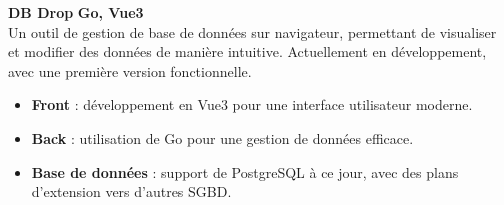 \documentclass[a4paper,10pt]{article}
\begin{document}
\begin{paracol}{2}
\begin{flushleft}
  \textbf{DB Drop} \hfill \textbf{Go, Vue3} \\
  Un outil de gestion de base de données sur navigateur, permettant de visualiser et modifier des données de manière intuitive.
  Actuellement en développement, avec une première version fonctionnelle.
  \begin{itemize}[left=0pt,label={--},nosep]
    \item \textbf{Front} : développement en Vue3 pour une interface utilisateur moderne.
    \item \textbf{Back} : utilisation de Go pour une gestion de données efficace.
    \item \textbf{Base de données} : support de PostgreSQL à ce jour, avec des plans d'extension vers d'autres SGBD.
  \end{itemize}
  \vspace{1em}

\end{flushleft}
  
\end{paracol}
\end{document}
